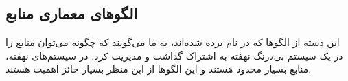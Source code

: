 \subsection{الگوهای معماری منابع}
\begin{RTL}
این دسته از الگوها که در \cite{ref4} نام برده شده‌اند،
به ما می‌گویند که چگونه می‌توان منابع را در یک سیستم بی‌درنگ نهفته
به اشتراک گذاشت و مدیریت کرد. در سیستم‌های نهفته، منابع بسیار محدود هستند
و این الگوها از این منظر بسیار حائز اهمیت هستند.
\end{RTL}





